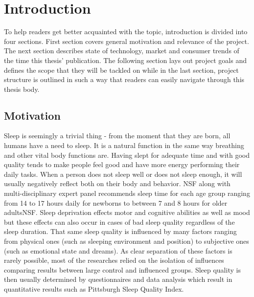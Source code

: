 \chapter{Introduction}
\label{chap:introduction}

To help readers get better acquainted with the topic, introduction is divided into four sections. First section covers general motivation and relevance of the project. The next section describes state of technology, market and consumer trends of the time this thesis' publication. The following section lays out project goals and defines the scope that they will be tackled on while in the last section, project structure is outlined in such a way that readers can easily navigate through this thesis body.


\section{Motivation}

Sleep is seemingly a trivial thing - from the moment that they are born, all humans have a need to sleep. It is a natural function in the same way breathing and other vital body functions are. Having slept for adequate time and with good quality tends to make people feel good and have more energy performing their daily tasks. When a person does not sleep well or does not sleep enough, it will usually negatively reflect both on their body and behavior. \ac{NSF} along with multi-disciplinary expert panel recommends sleep time for each age group ranging from 14 to 17 hours daily for newborns to between 7 and 8 hours for older adults\ac{NSF}. Sleep deprivation effects motor and cognitive abilities as well as mood but these effects can also occur in cases of bad sleep quality regardless of the sleep duration\cite{doi:10.1093/sleep/19.4.318}. That same sleep quality is influenced by many factors ranging from physical ones (such as sleeping environment and position) to subjective ones (such as emotional state and dreams). As clear separation of these factors is rarely possible, most of the researches relied on the isolation of influences comparing results between large control and influenced groups. Sleep quality is then usually determined by questionnaires and data analysis which result in quantitative results such as Pittsburgh Sleep Quality Index\cite{psqi}.\\

